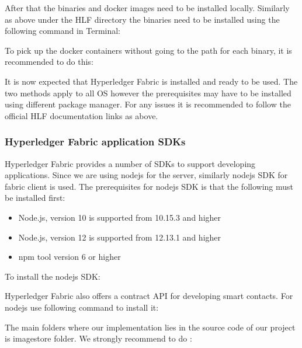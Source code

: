 After that the binaries and docker images need to be installed locally. Similarly as above under the HLF directory the binaries need to be installed using the following command in Terminal: 



To pick up the docker containers without going to the path for each binary, it is recommended to do this: 

It is now expected that Hyperledger Fabric is installed and ready to be used. The two methods apply to all OS however the prerequisites may have to be installed using different package manager. 
For any issues it is recommended to follow the official HLF documentation links as above.





\subsubsection{Hyperledger Fabric application SDKs} 

Hyperledger Fabric provides a number of SDKs to support developing applications. Since we are using nodejs for the server, similarly nodejs SDK for fabric client is used. 
The prerequisites for nodejs SDK is that the following must be installed first: 

\begin{itemize}
    \item Node.js, version 10 is supported from 10.15.3 and higher
    \item  Node.js, version 12 is supported from 12.13.1 and higher
    \item npm tool version 6 or higher
\end{itemize}

To install the nodejs SDK:


Hyperledger Fabric also offers a contract API for developing smart contacts. For nodejs use following command to install it:  


The main folders where our implementation lies in the source code of our project is {\selectfont imagestore} folder. We strongly recommend to do :

